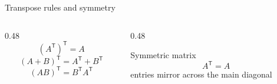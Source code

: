 \begin{frame}{Transpose rules and symmetry}
  \begin{columns}[T,onlytextwidth]
    \begin{column}{0.48\textwidth}
      \[
      (A^{\mathsf T})^{\mathsf T}=A
      \]
      \[
      (A+B)^{\mathsf T}=A^{\mathsf T}+B^{\mathsf T}
      \]
      \[
      (AB)^{\mathsf T}=B^{\mathsf T}A^{\mathsf T}
      \]
    \end{column}
    \begin{column}{0.48\textwidth}
      \begin{exampleblock}{Symmetric matrix}
        \[
        A^{\mathsf T}=A
        \]
        entries mirror across the main diagonal
      \end{exampleblock}
    \end{column}
  \end{columns}
\end{frame}
